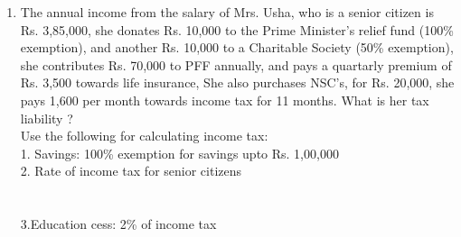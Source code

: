 \documentclass[journal,12pt,twocolumn]{IEEEtran}
\begin{document}
\begin{enumerate}[label=1.\arabic*]
\begin{enumerate}[label=2.\arabic*]
\begin{enumerate}[label=3.\arabic*]
\item The annual income from the salary of Mrs. Usha, who is a senior citizen is Rs. 3,85,000, she donates Rs. 10,000 to the Prime Minister's relief fund (100\% exemption), and another Rs. 10,000 to a Charitable Society (50\% exemption), she contributes Rs. 70,000 to PFF annually, and pays a quartarly premium of Rs. 3,500 towards life insurance, She also purchases NSC's, for Rs. 20,000, she pays 1,600 per month towards income tax for 11 months. What is her tax liability ?\\
Use the following for calculating income tax:\\
1. Savings: 100\% exemption for savings upto Rs. 1,00,000\\
2. Rate of income tax for senior citizens\\
\vspace{1mm}\\
\vspace{1mm}\\
3.Education cess: 2\% of  income tax\\
\end{enumerate}
\end{enumerate}
\end{enumerate}
\end{document}
